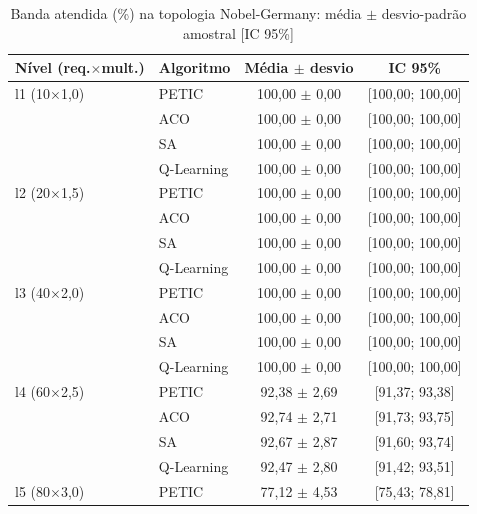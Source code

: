 \begin{table}[htb]
    \centering
    \small
    \caption{Banda atendida (\%) na topologia Nobel-Germany: média $\pm$ desvio-padrão amostral [IC 95\%]}
    \label{tab:banda-nobel-germany}
    \begin{tabular}{llcc}
        \hline
        Nível (req.$\times$mult.) & Algoritmo & Média $\pm$ desvio & IC 95\% \\
        \hline
        l1 (10$\times$1,0) & PETIC & 100,00 $\pm$ 0,00 & [100,00; 100,00] \\
         & ACO & 100,00 $\pm$ 0,00 & [100,00; 100,00] \\
         & SA & 100,00 $\pm$ 0,00 & [100,00; 100,00] \\
         & Q-Learning & 100,00 $\pm$ 0,00 & [100,00; 100,00] \\
        \hline
        l2 (20$\times$1,5) & PETIC & 100,00 $\pm$ 0,00 & [100,00; 100,00] \\
         & ACO & 100,00 $\pm$ 0,00 & [100,00; 100,00] \\
         & SA & 100,00 $\pm$ 0,00 & [100,00; 100,00] \\
         & Q-Learning & 100,00 $\pm$ 0,00 & [100,00; 100,00] \\
        \hline
        l3 (40$\times$2,0) & PETIC & 100,00 $\pm$ 0,00 & [100,00; 100,00] \\
         & ACO & 100,00 $\pm$ 0,00 & [100,00; 100,00] \\
         & SA & 100,00 $\pm$ 0,00 & [100,00; 100,00] \\
         & Q-Learning & 100,00 $\pm$ 0,00 & [100,00; 100,00] \\
        \hline
        l4 (60$\times$2,5) & PETIC & 92,38 $\pm$ 2,69 & [91,37; 93,38] \\
         & ACO & 92,74 $\pm$ 2,71 & [91,73; 93,75] \\
         & SA & 92,67 $\pm$ 2,87 & [91,60; 93,74] \\
         & Q-Learning & 92,47 $\pm$ 2,80 & [91,42; 93,51] \\
        \hline
        l5 (80$\times$3,0) & PETIC & 77,12 $\pm$ 4,53 & [75,43; 78,81] \\

\end{tabular}
\end{table}
